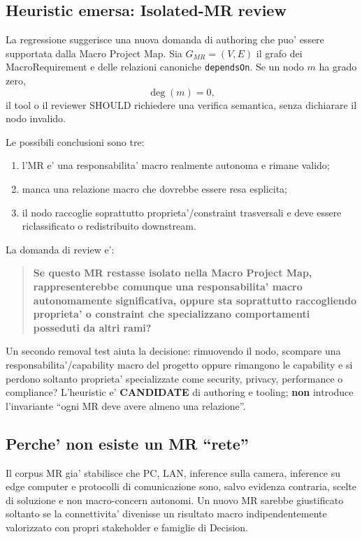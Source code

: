 \documentclass[11pt,a4paper]{article}
\newcommand{\candidate}{\textbf{CANDIDATE}}
\begin{document}
\subsection{Heuristic emersa: Isolated-MR review}

La regressione suggerisce una nuova domanda di authoring che puo' essere supportata dalla Macro Project Map. Sia $G_{MR}=(V,E)$ il grafo dei MacroRequirement e delle relazioni canoniche \texttt{dependsOn}. Se un nodo $m$ ha grado zero,
\[
\deg(m)=0,
\]
il tool o il reviewer SHOULD richiedere una verifica semantica, senza dichiarare il nodo invalido.

Le possibili conclusioni sono tre:
\begin{enumerate}
  \item l'MR e' una responsabilita' macro realmente autonoma e rimane valido;
  \item manca una relazione macro che dovrebbe essere resa esplicita;
  \item il nodo raccoglie soprattutto proprieta'/constraint trasversali e deve essere riclassificato o redistribuito downstream.
\end{enumerate}

La domanda di review e':

\begin{quote}
\textbf{Se questo MR restasse isolato nella Macro Project Map, rappresenterebbe comunque una responsabilita' macro autonomamente significativa, oppure sta soprattutto raccogliendo proprieta' o constraint che specializzano comportamenti posseduti da altri rami?}
\end{quote}

Un secondo removal test aiuta la decisione: rimuovendo il nodo, scompare una responsabilita'/capability macro del progetto oppure rimangono le capability e si perdono soltanto proprieta' specializzate come security, privacy, performance o compliance? L'heuristic e' \candidate{} di authoring e tooling; \textbf{non} introduce l'invariante ``ogni MR deve avere almeno una relazione''.

\subsection{Perche' non esiste un MR ``rete''}

Il corpus MR gia' stabilisce che PC, LAN, inference sulla camera, inference su edge computer e protocolli di comunicazione sono, salvo evidenza contraria, scelte di soluzione e non macro-concern autonomi. Un nuovo MR sarebbe giustificato soltanto se la connettivita' divenisse un risultato macro indipendentemente valorizzato con propri stakeholder e famiglie di Decision.
\end{document}
